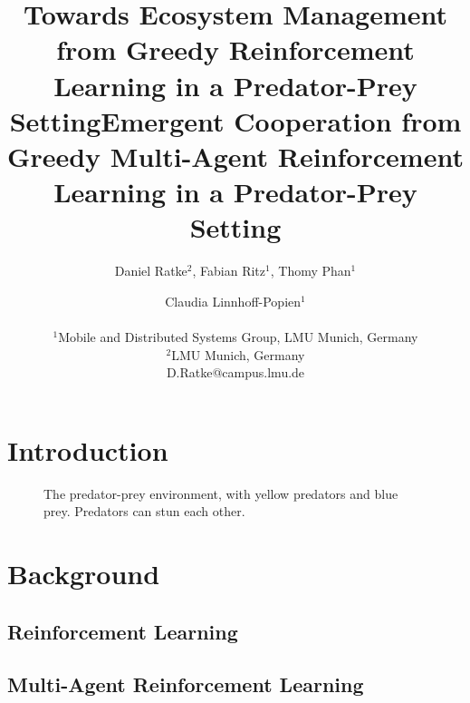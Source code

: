 \documentclass[letterpaper]{article}
\title{Towards Ecosystem Management from Greedy Reinforcement Learning in a Predator-Prey Setting}
\title{Emergent Cooperation from Greedy Multi-Agent Reinforcement Learning in a Predator-Prey Setting}
\author{Daniel Ratke$^{2}$, Fabian Ritz$^{1}$, Thomy Phan$^1$ \and Claudia Linnhoff-Popien$^1$ \\
\mbox{}\\
$^1$Mobile and Distributed Systems Group, LMU Munich, Germany \\
$^2$LMU Munich, Germany \\
D.Ratke@campus.lmu.de} %
\begin{document}
\maketitle

\begin{abstract}
    \blindtext[2]
\end{abstract}

\section{Introduction}

\blindtext[3]

\begin{figure}%
    \centering
    \caption{The predator-prey environment, with yellow predators and blue prey. Predators can stun each other.}%
    \label{fig:aquarium}%
\end{figure}

\section{Background}

\subsection{Reinforcement Learning}

\blindtext[2]

\subsection{Multi-Agent Reinforcement Learning}
\end{document}

